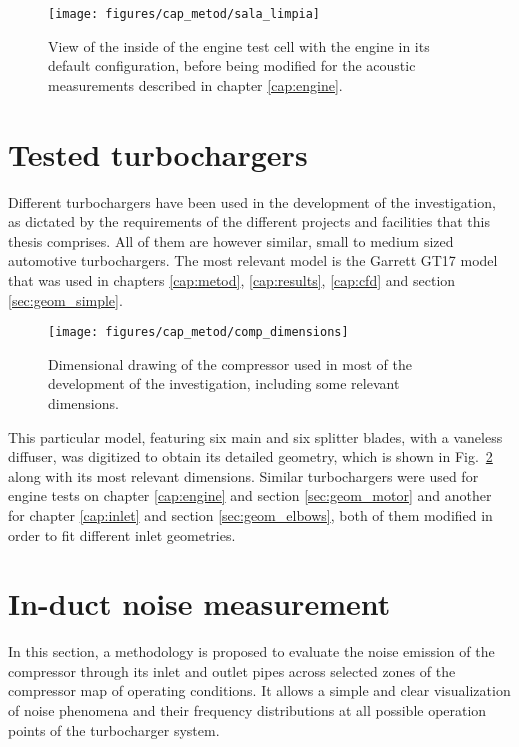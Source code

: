 \begin{figure}[b!]
\centering
\texttt{[image: figures/cap\_metod/sala\_limpia]}
\caption[View of the inside of the engine test cell]{View of the inside of the engine test cell with the engine in its default configuration, before being modified for the acoustic measurements described in chapter \ref{cap:engine}.}
\label{fig:engine_cell_clear}
\end{figure}

\section{Tested turbochargers}

Different turbochargers have been used in the development of the investigation, as dictated by the requirements of the different projects and facilities that this thesis comprises. All of them are however similar, small to medium sized automotive turbochargers. The most relevant model is the Garrett GT17 model that was used in chapters \ref{cap:metod}, \ref{cap:results}, \ref{cap:cfd} and section \ref{sec:geom_simple}. 

\begin{figure}[h!]
\centering
\texttt{[image: figures/cap\_metod/comp\_dimensions]}
\caption[Dimensional drawing of the compressor]{Dimensional drawing of the compressor used in most of the development of the investigation, including some relevant dimensions.}
\label{fig:comp_dimens}
\end{figure}

This particular model, featuring six main and six splitter blades, with a vaneless diffuser, was digitized to obtain its detailed geometry, which is shown in Fig.~\ref{fig:comp_dimens} along with its most relevant dimensions. Similar turbochargers were used for engine tests on chapter \ref{cap:engine} and section \ref{sec:geom_motor} and another for chapter \ref{cap:inlet} and section \ref{sec:geom_elbows}, both of them modified in order to fit different inlet geometries.

\section{In-duct noise measurement} %
\label{sec:method_induct}

In this section, a methodology is proposed to evaluate the noise emission of the compressor through its inlet and outlet pipes across selected zones of the compressor map of operating conditions. It allows a simple and clear visualization of noise phenomena and their frequency distributions at all possible operation points of the turbocharger system.

